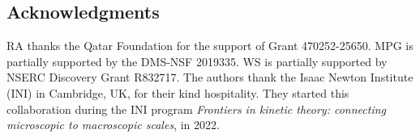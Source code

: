 \documentclass[11pt,american, reqno]{amsart}
\numberwithin{equation}{section}
\newcommand{\1}{\mathds{1}}
\numberwithin{equation}{section}
\begin{document}
\subsection*{Acknowledgments} RA thanks the Qatar Foundation for the support of Grant 470252-25650.  MPG is partially supported by the DMS-NSF 2019335. WS is partially supported by NSERC Discovery Grant R832717. The authors thank the Isaac Newton Institute (INI) in Cambridge, UK, for their kind hospitality. They started this collaboration during the INI program {\it Frontiers in kinetic theory: connecting microscopic to macroscopic scales}, in 2022.




\end{document}
